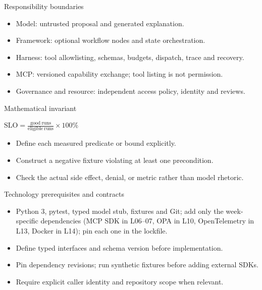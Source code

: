 \documentclass[aspectratio=169,10pt]{beamer}
\begin{document}
\begin{frame}{Responsibility boundaries}
\small
\begin{itemize}
\item Model: untrusted proposal and generated explanation.
\item Framework: optional workflow nodes and state orchestration.
\item Harness: tool allowlisting, schemas, budgets, dispatch, trace and recovery.
\item MCP: versioned capability exchange; tool listing is not permission.
\item Governance and resource: independent access policy, identity and reviews.
\end{itemize}

\end{frame}

\begin{frame}{Mathematical invariant}
\small
\begin{center}\Large $\mathrm{SLO}=\frac{\mathrm{good\ runs}}{\mathrm{eligible\ runs}}\times100\%$\end{center}
\begin{itemize}
\item Define each measured predicate or bound explicitly.
\item Construct a negative fixture violating at least one precondition.
\item Check the actual side effect, denial, or metric rather than model rhetoric.
\end{itemize}

\end{frame}

\begin{frame}{Technology prerequisites and contracts}
\small
\begin{itemize}
\item Python 3, pytest, typed model stub, fixtures and Git; add only the week-specific dependencies (MCP SDK in L06--07, OPA in L10, OpenTelemetry in L13, Docker in L14); pin each one in the lockfile.
\item Define typed interfaces and schema version before implementation.
\item Pin dependency revisions; run synthetic fixtures before adding external SDKs.
\item Require explicit caller identity and repository scope when relevant.
\end{itemize}

\end{frame}
\end{document}
